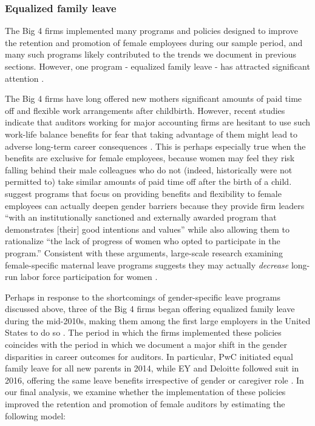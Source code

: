 \documentclass[11pt]{article}
\begin{document}
            
        \subsubsection{Equalized family leave}\label{section:equalizedLeave}
            The Big 4 firms implemented many programs and policies designed to improve the retention and promotion of female employees during our sample period, and many such programs likely contributed to the trends we document in previous sections. However, one program - equalized family leave - has attracted significant attention \parencite{ballesteroImportanceOrganizationalCulture2023, picchiPaternityLeaveIgnored2020, connleyHowUnequalPaid2020}. 
                
            The Big 4 firms have long offered new mothers significant amounts of paid time off and flexible work arrangements after childbirth. However, recent studies indicate that auditors working for major accounting firms are hesitant to use such work-life balance benefits for fear that taking advantage of them might lead to adverse long-term career consequences \parencite{buchheitContemporaryAnalysisAccounting2016}. This is perhaps especially true when the benefits are exclusive for female employees, because women may feel they risk falling behind their male colleagues who do not (indeed, historically were not permitted to) take similar amounts of paid time off after the birth of a child. \textcite{kornbergerChangingGenderDomination2010} suggest programs that focus on providing benefits and flexibility to female employees can actually deepen gender barriers because they provide firm leaders ``with an institutionally sanctioned and externally awarded program that demonstrates [their] good intentions and values'' while also allowing them to rationalize ``the lack of progress of women who opted to participate in the program.'' Consistent with these arguments, large-scale research examining female-specific maternal leave programs suggests they may actually \textit{decrease} long-run labor force participation for women \parencite{baileyLongTermEffectsCalifornias2019}. 

            Perhaps in response to the shortcomings of gender-specific leave programs discussed above, three of the Big 4 firms began offering equalized family leave during the mid-2010s, making them among the first large employers in the United States to do so \parencite{ballesteroImportanceOrganizationalCulture2023}. The period in which the firms implemented these policies coincides with the period in which we document a major shift in the gender disparities in career outcomes for auditors. In particular, PwC initiated equal family leave for all new parents in 2014, while EY and Deloitte followed suit in 2016, offering the same leave benefits irrespective of gender or caregiver role \parencite{deloitteDeloitteAnnounces162016, edgleyDiversityProfessionalismBig2016, elejalde-ruizNewFrontierPaid2016}. In our final analysis, we examine whether the implementation of these policies improved the retention and promotion of female auditors by estimating the following model: \vspace{-6ex}
    
\end{document}
